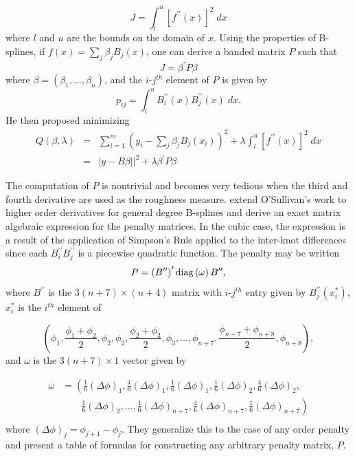 \documentclass[12pt]{article}
\theoremstyle{definition}
\begin{document}
 \[
 J = \int_l^u \left[ f^{\prime \prime}\left(x\right)\right]^2\;dx
 \]
 \noindent
 where $l$ and $u$ are the bounds on the domain of $x$. Using the properties of B-splines, if $f\left(x\right) = \sum_{j} \beta_j B_j\left(x\right)$, one can derive a banded matrix $P$ such that 
 \[
 J = \beta^\prime P \beta
 \] 
 \noindent
 where $\beta = \left(\beta_1,\dots, \beta_n\right)$, and the $i$-$j^{th}$ element of $P$ is given by
 \[
 p_{ij} = \int_l^u B_i^{\prime \prime} \left( x \right)B_j^{\prime \prime} \left( x \right)\;dx.
 \]
 \noindent
 He then proposed minimizing
 \begin{eqnarray*}
 Q\left(\beta, \lambda \right) &=& \sum_{i=1}^m \left(y_i - \sum_{j} \beta_j B_j\left(x_i \right)\right)^2 + \lambda \int_l^u \left[ f^{\prime \prime}\left(x\right)\right]^2\;dx\\
 &=& \vert y - B\beta \vert  \vert^2 + \lambda\beta^\prime P \beta
 \end{eqnarray*}

The computation of $P$ is nontrivial and becomes very tedious when the third and fourth derivative are used as the roughness measure. \cite{wand2008semiparametric} extend O'Sullivan's work to higher order derivatives for general degree B-splines and derive an exact matrix algebraic expression for the penalty matrices. In the cubic case, the expression is a result of the application of Simpson's Rule applied to the inter-knot differences since each $B_i^{\prime \prime} B_j^{\prime \prime}$ is a piecewise quadratic function. The penalty may be written
 \[
 P = \left(B^{\prime \prime}\right)^\prime \textup{diag}\left(\omega \right) B^{\prime \prime}, 
 \]
 \noindent
 where $B^{\prime \prime}$ is the $3\left( n + 7 \right) \times \left( n + 4 \right)$ matrix with $i$-$j^{th}$ entry given by $B_j^{\prime \prime} \left(x_i^*\right)$, $x^*_i$ is the $i^{th}$ element of 
 
\[
\left( \phi_1,\frac{\phi_1+\phi_2}{2},\phi_2,\phi_2,\frac{\phi_2+\phi_3}{2},\phi_3,\dots,\phi_{n+7},\frac{\phi_{n+7}+\phi_{n+8}}{2},\phi_{n+8} \right),
\]
 \noindent
 and $\omega$ is the $3\left(n+7\right) \times 1$ vector given by
 
\begin{align*}
\omega &= \left( \frac{1}{6}\left(\Delta \phi \right)_1,\frac{4}{6}\left(\Delta \phi \right)_1, \frac{1}{6}\left(\Delta \phi \right)_1,\frac{1}{6}\left(\Delta \phi \right)_2, \frac{4}{6}\left(\Delta \phi \right)_2,  \right. \\
&\qquad   \left. {} \frac{1}{6}\left(\Delta \phi \right)_2 , \dots , \frac{1}{6}\left(\Delta \phi \right)_{n+7}, \frac{4}{6}\left(\Delta \phi \right)_{n+7}, \frac{1}{6}\left(\Delta \phi \right)_{n+7}  \right) \\
\end{align*}
\noindent
 where $\left(\Delta \phi \right)_j = \phi_{j+1}-\phi_j$. They generalize this to the case of any order penalty and present a table of formulas for constructing any arbitrary penalty matrix, $P$.
 
\end{document}
